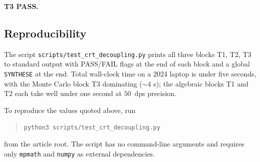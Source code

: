 \textbf{T3 PASS.}

\subsection{Reproducibility}
\label{appssec:reproducibility}

The script \texttt{scripts/test\_crt\_decoupling.py} prints all
three blocks T1, T2, T3 to standard output with PASS/FAIL flags
at the end of each block and a global \texttt{SYNTHESE} at the
end. Total wall-clock time on a 2024 laptop is under five
seconds, with the Monte Carlo block T3 dominating ($\sim 4$ s);
the algebraic blocks T1 and T2 each take well under one second
at $50$~dps precision.

To reproduce the values quoted above, run
\begin{quote}
  \texttt{python3 scripts/test\_crt\_decoupling.py}
\end{quote}
from the article root. The script has no command-line arguments
and requires only \texttt{mpmath} and \texttt{numpy} as
external dependencies.
